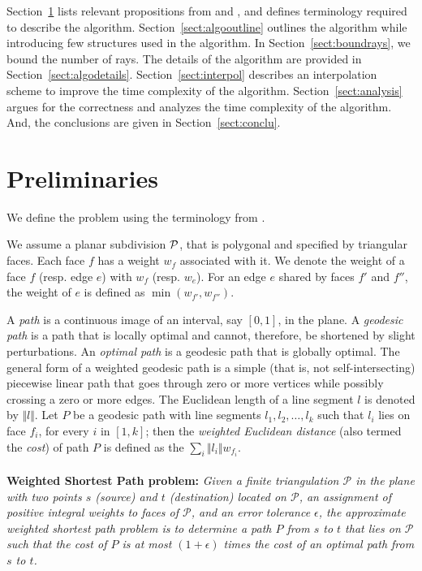 \documentclass[11pt]{article}
\def\calP{\mathcal{P}}
\begin{document}
Section~\ref{sect:prelim} lists relevant propositions from \cite{journals/jacm/MitchellP91} and \cite{journals/jal/SunR06}, and defines terminology required to describe the algorithm. 
Section~\ref{sect:algooutline} outlines the algorithm while introducing few structures used in the algorithm.
In Section~\ref{sect:boundrays}, we bound the number of rays.
The details of the algorithm are provided in Section~\ref{sect:algodetails}.
Section~\ref{sect:interpol} describes an interpolation scheme to improve the time complexity of the algorithm. 
Section~\ref{sect:analysis} argues for the correctness and analyzes the time complexity of the algorithm.
And, the conclusions are given in Section~\ref{sect:conclu}.

\section{Preliminaries}
\label{sect:prelim}

We define the problem using the terminology from \cite{journals/jacm/MitchellP91}.

We assume a planar subdivision ${\cal P}$, that is polygonal and specified by triangular faces.
Each face $f$ has a weight $w_f$ associated with it. 
We denote the weight of a face $f$ (resp. edge $e$) with $w_f$ (resp. $w_e$).
For an edge $e$ shared by faces $f'$ and $f''$, the weight of $e$ is defined as $\min(w_{f'}, w_{f''})$.

A {\it path} is a continuous image of an interval, say $[0, 1]$, in the plane.
A {\it geodesic path} is a path that is locally optimal and cannot, therefore, be shortened by slight perturbations.
An {\it optimal path} is a geodesic path that is globally optimal.
The general form of a weighted geodesic path is a simple (that is, not self-intersecting) piecewise linear path that goes through zero or more vertices while possibly crossing a zero or more edges.
The Euclidean length of a line segment $l$ is denoted by $\Vert l \Vert$.
Let $P$ be a geodesic path with line segments $l_1, l_2, \ldots, l_k$ such that $l_i$ lies on face $f_i$, for every $i$ in $[1, k]$; then the {\it weighted Euclidean distance} (also termed the {\it cost}) of path $P$ is defined as the $\sum_i \Vert l_i \Vert w_{f_i}$.\\ \\
{\bf Weighted Shortest Path problem:}
{\em Given a finite triangulation $\calP$ in the plane with two points $s$ (source) and $t$ (destination) located on $\calP$, an assignment of positive integral weights to faces of $\calP$, and an error tolerance $\epsilon$, the {\it approximate weighted shortest path} problem is to determine a path $P$ from $s$ to $t$ that lies on $\calP$ such that the cost of $P$ is at most $(1+\epsilon)$ times the cost of an optimal path from $s$ to $t$.}\\
\end{document}
